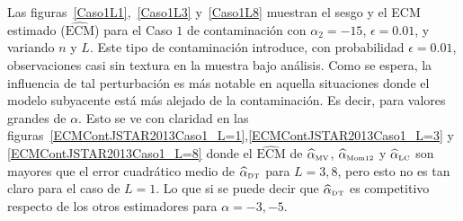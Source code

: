 
Las figuras~\ref{Caso1L1},~\ref{Caso1L3} y~\ref{Caso1L8} muestran el sesgo y el ECM estimado ($\widehat{\text{ECM}}$) para el Caso $1$ de contaminación con $\alpha_2=-15$, $\epsilon=0.01$, y variando $n$ y $L$.  
Este tipo de contaminación introduce, con probabilidad $\epsilon=0.01$, observaciones casi sin textura en la muestra bajo análisis. Como se espera, la influencia de tal perturbación es más notable en aquella situaciones donde el modelo subyacente está más alejado de la contaminación. Es decir, para valores grandes de $\alpha$. Esto se ve con claridad en las figuras~\ref{ECMContJSTAR2013Caso1_L=1},\ref{ECMContJSTAR2013Caso1_L=3} y \ref{ECMContJSTAR2013Caso1_L=8} donde el $\widehat{\text{ECM}}$ de $\widehat{\alpha}_{\text{\tiny{MV}}}$, $\widehat\alpha_{\text{\tiny{Mom12}}}$ y $\widehat\alpha_{\text{\tiny{LC}}}$ son mayores que el error cuadrático medio de $\widehat\alpha_{\text{\tiny{DT}}}$ para $L=3,8$, pero esto no es tan claro para el caso de $L=1$. Lo que si se puede decir que $\widehat\alpha_{\text{\tiny{DT}}}$ es competitivo respecto de los otros estimadores para $\alpha=-3,-5$.

